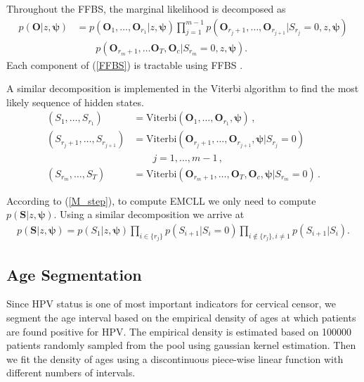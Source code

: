 \documentclass{article}
\begin{document}
Throughout the FFBS, the marginal likelihood is decomposed as
\begin{align}
p(\bm O |z, \bm \psi) & = p(\bm O_1, \ldots, \bm O_{r_1}| z, \bm \psi) \prod_{j = 1}^{m-1}p(\bm O_{r_j+1}, \ldots, \bm O_{r_{j+1}}| S_{r_j} = 0, z, \bm \psi) \nonumber \\
& \qquad p(\bm O_{r_m+1}, \ldots \bm O_T, \bm O_{c}| S_{r_m} = 0, z, \bm \psi). 
\label{FFBS}
\end{align}
Each component of (\ref{FFBS}) is tractable using FFBS \cite{Kitagawa_1987}.

A similar decomposition is implemented in the Viterbi algorithm to find the most likely sequence of hidden states.
\begin{align}
(S_1, \ldots, S_{r_1}) & = \mathrm{Viterbi}(\bm O_1, \ldots, \bm O_{r_1}, \bm \psi)\,, \nonumber \\
(S_{r_j+1}, \ldots, S_{r_{j+1}}) & = \mathrm{Viterbi}(\bm O_{r_j+1}, \ldots, \bm O_{r_{j+1}}, \bm \psi| S_{r_j} = 0)  \nonumber \\
& \qquad j = 1, \ldots, m-1\,,  \nonumber \\
(S_{r_m}, \ldots, S_{T}) & = \mathrm{Viterbi}(\bm O_{r_m+1}, \ldots, \bm O_{T}, \bm O_{c}, \bm \psi | S_{r_m} = 0) \,.
\end{align}

According to (\ref{M_step}), to compute EMCLL we only need to compute $p(\bm S| z, \bm{\psi})$. Using a similar decomposition we arrive at
\begin{eqnarray*}
	p(\bm S|z, \bm\psi) =  p(S_1|z, \bm \psi)\prod_{i \in \{r_j\}} p(S_{i+1}| S_i=0) \prod_{i \notin \{r_j\}, i \neq 1} p(S_{i+1}| S_i).
\end{eqnarray*}


\subsection{Age Segmentation} \label{sec:age}
Since HPV status is one of most important indicators for cervical censor, we segment the age interval based on the empirical density of ages at which patients are found positive for HPV. The empirical density is estimated based on 100000 patients randomly sampled from the pool using gaussian kernel estimation. Then we fit the density of ages using a discontinuous piece-wise linear function with different numbers of intervals. 
\end{document}
